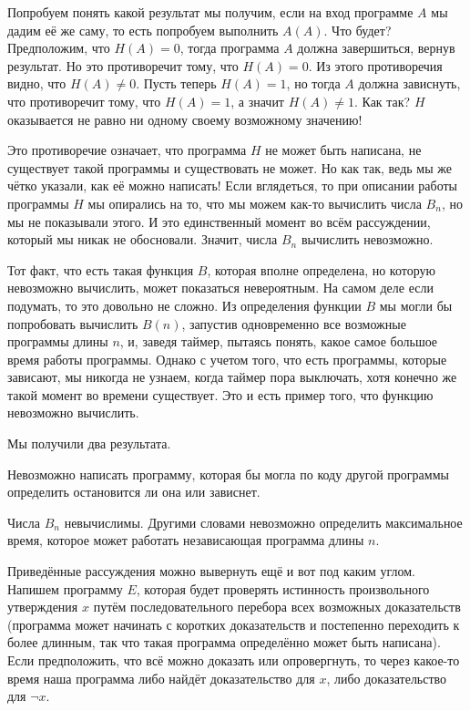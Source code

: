 Попробуем понять какой результат мы получим, если на вход программе $A$ мы дадим её же саму, то есть попробуем выполнить $A(A)$. Что будет? Предположим, что $H(A)=0$, тогда программа $A$ должна завершиться, вернув результат. Но это противоречит тому, что $H(A)=0$. Из этого противоречия видно, что $H(A)\not=0$. Пусть теперь $H(A)=1$, но тогда $A$ должна зависнуть, что противоречит тому, что $H(A)=1$, а значит $H(A)\not=1$. Как так? $H$ оказывается не равно ни одному своему возможному значению!

Это противоречие означает, что программа $H$ не может быть написана, не существует такой программы и существовать не может. Но как так, ведь мы же чётко указали, как её можно написать! Если вглядеться, то при описании работы программы $H$ мы опирались на то, что мы можем как-то вычислить числа $B_n$, но мы не показывали этого. И это единственный момент во всём рассуждении, который мы никак не обосновали. Значит, числа $B_n$ вычислить невозможно.

Тот факт, что есть такая функция $B$, которая вполне определена, но которую невозможно вычислить, может показаться невероятным. На самом деле если подумать, то это довольно не сложно. Из определения функции $B$ мы могли бы попробовать вычислить $B(n)$, запустив одновременно все возможные программы длины $n$, и, заведя таймер, пытаясь понять, какое самое большое время работы программы. Однако с учетом того, что есть программы, которые зависают, мы никогда не узнаем, когда таймер пора выключать, хотя конечно же такой момент во времени существует. Это и есть пример того, что функцию невозможно вычислить.

Мы получили два результата.

\begin{thm}
Невозможно написать программу, которая бы могла по коду другой программы определить остановится ли она или зависнет.
\end{thm}
\begin{thm}
Числа $B_n$ невычислимы. Другими словами невозможно определить максимальное время, которое может работать независающая программа длины $n$.
\end{thm}

Приведённые рассуждения можно вывернуть ещё и вот под каким углом. Напишем программу $E$, которая будет проверять истинность произвольного утверждения $x$ путём последовательного перебора всех возможных доказательств (программа может начинать с коротких доказательств и постепенно переходить к более длинным, так что такая программа определённо может быть написана). Если предположить, что всё можно доказать или опровергнуть, то через какое-то время наша программа либо найдёт доказательство для $x$, либо доказательство для $\neg x$.

